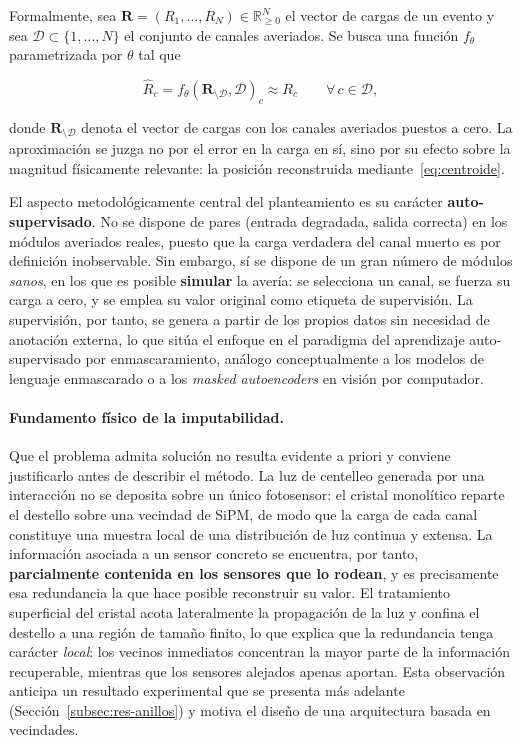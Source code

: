 Formalmente, sea $\mathbf{R} = (R_1, \dots, R_N) \in \mathbb{R}_{\geq 0}^{N}$ el vector de cargas de
un evento y sea $\mathcal{D} \subset \{1,\dots,N\}$ el conjunto de canales averiados. Se busca una
función $f_\theta$ parametrizada por $\theta$ tal que

\begin{equation}
    \hat{R}_c = f_\theta\!\left(\mathbf{R}_{\setminus \mathcal{D}}, \mathcal{D}\right)_c
    \approx R_c
    \qquad \forall\, c \in \mathcal{D},
    \label{eq:problema-imputacion}
\end{equation}

donde $\mathbf{R}_{\setminus \mathcal{D}}$ denota el vector de cargas con los canales averiados
puestos a cero. La aproximación se juzga no por el error en la carga en sí, sino por su efecto sobre
la magnitud físicamente relevante: la posición reconstruida mediante~\eqref{eq:centroide}.

El aspecto metodológicamente central del planteamiento es su carácter
\textbf{auto-supervisado}. No se dispone de pares (entrada degradada, salida correcta) en los
módulos averiados reales, puesto que la carga verdadera del canal muerto es por definición
inobservable. Sin embargo, sí se dispone de un gran número de módulos \emph{sanos}, en los que es
posible \textbf{simular} la avería: se selecciona un canal, se fuerza su carga a cero, y se emplea
su valor original como etiqueta de supervisión. La supervisión, por tanto, se genera a partir de los
propios datos sin necesidad de anotación externa, lo que sitúa el enfoque en el paradigma del
aprendizaje auto-supervisado por enmascaramiento, análogo conceptualmente a los modelos de lenguaje
enmascarado o a los \emph{masked autoencoders} en visión por computador.

\paragraph{Fundamento físico de la imputabilidad.} Que el problema admita solución no resulta
evidente a priori y conviene justificarlo antes de describir el método. La luz de centelleo
generada por una interacción no se deposita sobre un único fotosensor: el cristal monolítico
reparte el destello sobre una vecindad de SiPM, de modo que la carga de cada canal constituye una
muestra local de una distribución de luz continua y extensa. La información asociada a un sensor
concreto se encuentra, por tanto, \textbf{parcialmente contenida en los sensores que lo rodean}, y
es precisamente esa redundancia la que hace posible reconstruir su valor. El tratamiento
superficial del cristal acota lateralmente la propagación de la luz y confina el destello a una
región de tamaño finito, lo que explica que la redundancia tenga carácter \emph{local}: los vecinos
inmediatos concentran la mayor parte de la información recuperable, mientras que los sensores
alejados apenas aportan. Esta observación anticipa un resultado experimental que se presenta más
adelante (Sección~\ref{subsec:res-anillos}) y motiva el diseño de una arquitectura basada en
vecindades.

